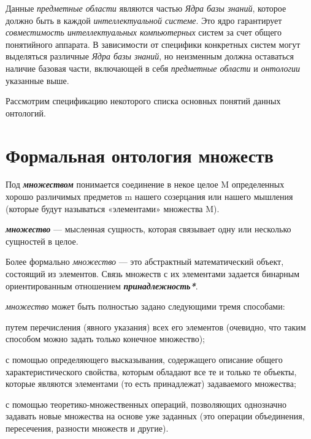 Данные \textit{предметные области} являются частью \textit{Ядра базы знаний}, которое должно быть в каждой \textit{интеллектуальной системе}. Это ядро гарантирует \textit{совместимость интеллектуальных компьютерных} систем за счет общего понятийного аппарата. В зависимости от специфики конкретных систем могут выделяться различные \textit{Ядра базы знаний}, но неизменным должна оставаться наличие базовая части, включающей в себя \textit{предметные области} и \textit{онтологии} указанные выше.

Рассмотрим спецификацию некоторого списка основных понятий данных онтологий.

\section{Формальная онтология множеств}
\label{sec_top_ontologies_set}

Под \textbf{\textit{множеством}} понимается соединение в некое целое M определенных хорошо различимых предметов m нашего созерцания или нашего мышления (которые будут называться «элементами» множества M). 

\textbf{\textit{множество}} --- мысленная сущность, которая связывает одну или несколько сущностей в целое.

Более формально \textit{множество} --- это абстрактный математический объект, состоящий из элементов. Связь множеств с их элементами задается бинарным ориентированным отношением \textbf{\textit{принадлежность*}}.

\textit{множество} может быть полностью задано следующими тремя способами:

\begin{textitemize}
	\item путем перечисления (явного указания) всех его элементов (очевидно, что таким способом можно задать только конечное множество);
	\item с помощью определяющего высказывания, содержащего описание общего характеристического свойства, которым обладают все те и только те объекты, которые являются элементами (то есть принадлежат) задаваемого множества;
	\item с помощью теоретико-множественных операций, позволяющих однозначно задавать новые множества на основе уже заданных (это операции объединения, пересечения, разности множеств и другие).
\end{textitemize}

